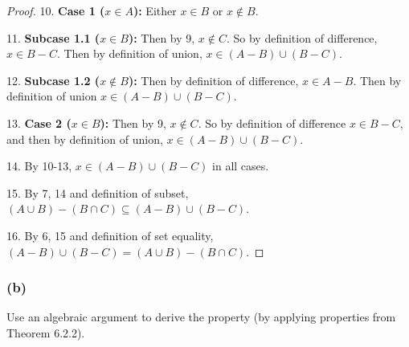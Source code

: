 \documentclass[14pt]{extarticle}
\begin{document}
\begin{proof}
  10. {\bf Case 1 (\(x \in A\)):} Either $x \in B$ or $x \notin B$.

  11. {\bf Subcase 1.1 (\(x \in B\)):} Then by 9, \(x \notin C\). So by definition of difference, \(x \in B-C\). Then by
  definition of union, \(x \in (A-B) \cup (B-C)\).

  12. {\bf Subcase 1.2 (\(x \notin B\)):} Then by definition of difference, \(x \in A - B\). Then by definition of union
  \(x \in (A-B) \cup (B-C)\).

  13. {\bf Case 2 (\(x \in B\)):} Then by 9, \(x \notin C\). So by definition of difference \(x \in B-C\), and then by
  definition of union, \(x \in (A-B) \cup (B-C)\).

  14. By 10-13, \(x \in (A-B) \cup (B-C)\) in all cases.

  15. By 7, 14 and definition of subset, \((A \cup B) - (B \cap C) \subseteq (A - B) \cup (B - C)\).

  16. By 6, 15 and definition of set equality, \((A - B) \cup (B - C) = (A \cup B) - (B \cap C)\).
\end{proof}

\subsubsection{(b)}
Use an algebraic argument to derive the property (by applying properties from Theorem 6.2.2).
\end{document}
